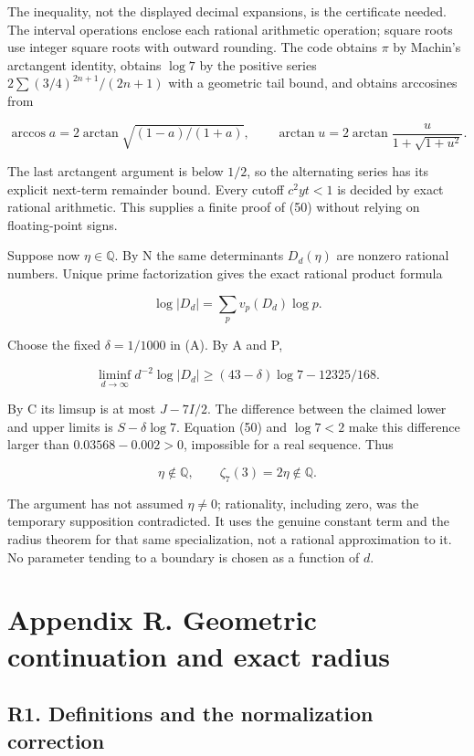 \documentclass[11pt,a4paper]{article}
\begin{document}
The inequality, not the displayed decimal expansions, is the certificate needed. The interval operations enclose each rational arithmetic operation; square roots use integer square roots with outward rounding. The code obtains \(π\) by Machin's arctangent identity, obtains \(\operatorname{log} 7\) by the positive series \(2\sum (3/4)^{2n+1}/(2n+1)\) with a geometric tail bound, and obtains arccosines from

\[
\arccos a=2\arctan\sqrt{(1-a)/(1+a)},\qquad
\arctan u=2\arctan\frac{u}{1+\sqrt{1+u^2}}.
\]

The last arctangent argument is below \(1/2\), so the alternating series has its explicit next-term remainder bound. Every cutoff \(c^{2}yt<1\) is decided by exact rational arithmetic. This supplies a finite proof of (50) without relying on floating-point signs.

Suppose now \(η∈\mathbb{Q}\). By N the same determinants \(D_d(η)\) are nonzero rational numbers. Unique prime factorization gives the exact rational product formula

\[
\log|D_d|=\sum_p v_p(D_d)\log p.
\]

Choose the fixed \(δ=1/1000\) in (A). By A and P,

\[
\liminf_{d\to\infty}d^{-2}\log|D_d|
\ge(43-\delta)\log7-12325/168.
\]

By C its limsup is at most \(J-7I/2\). The difference between the claimed lower and upper limits is \(S-δ \operatorname{log} 7\). Equation (50) and \(\operatorname{log} 7<2\) make this difference larger than \(0.03568-0.002>0\), impossible for a real sequence. Thus

\[
\eta\notin\mathbb Q,\qquad \zeta_7(3)=2\eta\notin\mathbb Q.
\]

The argument has not assumed \(η≠0\); rationality, including zero, was the temporary supposition contradicted. It uses the genuine constant term and the radius theorem for that same specialization, not a rational approximation to it. No parameter tending to a boundary is chosen as a function of \(d\).

\clearpage

\hypertarget{appendix-r.-geometric-continuation-and-exact-radius}{%
\section{Appendix R. Geometric continuation and exact radius}\label{appendix-r.-geometric-continuation-and-exact-radius}}

\hypertarget{r1.-definitions-and-the-normalization-correction}{%
\subsection{R1. Definitions and the normalization correction}\label{r1.-definitions-and-the-normalization-correction}}
\end{document}
